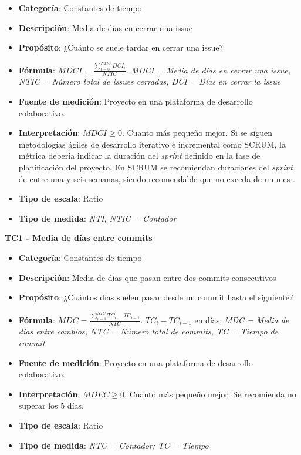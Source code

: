 \begin{itemize}
	\item \textbf{Categoría}: Constantes de tiempo
	\item \textbf{Descripción}:  Media de días en cerrar una issue
	\item \textbf{Propósito}: ¿Cuánto se suele tardar en cerrar una issue? 
	\item \textbf{Fórmula}: $MDCI = \frac{\sum_{i=0}^{NTIC}DCI_i}{NTIC}$. \textit{MDCI = Media de días en cerrar una issue, NTIC = Número total de issues cerradas, DCI = Días en cerrar la issue}
	\item \textbf{Fuente de medición}: Proyecto en una plataforma de desarrollo colaborativo.
	\item \textbf{Interpretación}: $MDCI \geq 0$. Cuanto más pequeño mejor. Si se siguen metodologías ágiles de desarrollo iterativo e incremental como SCRUM, la métrica debería indicar la duración del \textit{sprint} definido en la fase de planificación del proyecto. En SCRUM se recomiendan duraciones del \textit{sprint} de entre una y seis semanas, siendo recomendable que no exceda de un mes \cite{scrum_master_scrum_2019}.
	\item \textbf{Tipo de escala}: Ratio
	\item \textbf{Tipo de medida}: \textit{NTI, NTIC = Contador}
\end{itemize}

\textbf{\underline{TC1 - Media de días entre commits}}

\begin{itemize}
	\item \textbf{Categoría}: Constantes de tiempo
	\item \textbf{Descripción}: Media de días que pasan entre dos commits consecutivos
	\item \textbf{Propósito}: ¿Cuántos días suelen pasar desde un commit hasta el siguiente?
	\item \textbf{Fórmula}: $MDC = \frac{\sum_{i=1}^{NTC} TC_i - TC_{i-1}}{NTC}$. $TC_i - TC_{i-1}$ en días; \textit{MDC = Media de días entre cambios, NTC = Número total de commits, TC = Tiempo de commit}
	\item \textbf{Fuente de medición}: Proyecto en una plataforma de desarrollo colaborativo.
	\item \textbf{Interpretación}: $MDEC \geq 0$. Cuanto más pequeño mejor. Se recomienda no superar los 5 días.
	\item \textbf{Tipo de escala}: Ratio
	\item \textbf{Tipo de medida}: \textit{NTC = Contador; TC = Tiempo}
\end{itemize}

